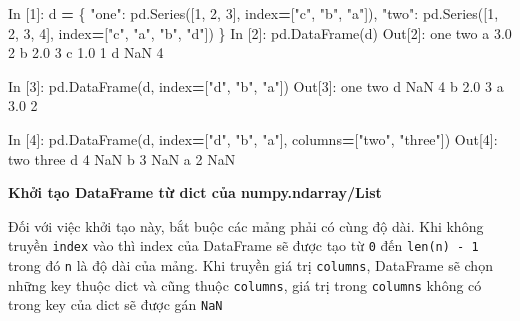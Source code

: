\documentclass[
]{book}
\newenvironment{Shaded}{\begin{snugshade}}{\end{snugshade}}
\newcommand{\DecValTok}[1]{\textcolor[rgb]{0.00,0.00,0.81}{#1}}
\newcommand{\FloatTok}[1]{\textcolor[rgb]{0.00,0.00,0.81}{#1}}
\newcommand{\NormalTok}[1]{#1}
\newcommand{\OperatorTok}[1]{\textcolor[rgb]{0.81,0.36,0.00}{\textbf{#1}}}
\newcommand{\StringTok}[1]{\textcolor[rgb]{0.31,0.60,0.02}{#1}}
\begin{document}
\begin{Shaded}
\begin{Highlighting}[]
\NormalTok{In [}\DecValTok{1}\NormalTok{]: d }\OperatorTok{=}\NormalTok{ \{}
            \StringTok{"one"}\NormalTok{: pd.Series([}\DecValTok{1}\NormalTok{, }\DecValTok{2}\NormalTok{, }\DecValTok{3}\NormalTok{], index}\OperatorTok{=}\NormalTok{[}\StringTok{"c"}\NormalTok{, }\StringTok{"b"}\NormalTok{, }\StringTok{"a"}\NormalTok{]),}
            \StringTok{"two"}\NormalTok{: pd.Series([}\DecValTok{1}\NormalTok{, }\DecValTok{2}\NormalTok{, }\DecValTok{3}\NormalTok{, }\DecValTok{4}\NormalTok{], index}\OperatorTok{=}\NormalTok{[}\StringTok{"c"}\NormalTok{, }\StringTok{"a"}\NormalTok{, }\StringTok{"b"}\NormalTok{, }\StringTok{"d"}\NormalTok{])}
\NormalTok{        \}}
\NormalTok{In [}\DecValTok{2}\NormalTok{]: pd.DataFrame(d)}
\NormalTok{Out[}\DecValTok{2}\NormalTok{]:}
\NormalTok{   one  two}
\NormalTok{a  }\FloatTok{3.0}    \DecValTok{2}
\NormalTok{b  }\FloatTok{2.0}    \DecValTok{3}
\NormalTok{c  }\FloatTok{1.0}    \DecValTok{1}
\NormalTok{d  NaN    }\DecValTok{4}

\NormalTok{In [}\DecValTok{3}\NormalTok{]: pd.DataFrame(d, index}\OperatorTok{=}\NormalTok{[}\StringTok{"d"}\NormalTok{, }\StringTok{"b"}\NormalTok{, }\StringTok{"a"}\NormalTok{])}
\NormalTok{Out[}\DecValTok{3}\NormalTok{]: }
\NormalTok{   one  two}
\NormalTok{d  NaN    }\DecValTok{4}
\NormalTok{b  }\FloatTok{2.0}    \DecValTok{3}
\NormalTok{a  }\FloatTok{3.0}    \DecValTok{2}

\NormalTok{In [}\DecValTok{4}\NormalTok{]: pd.DataFrame(d, index}\OperatorTok{=}\NormalTok{[}\StringTok{"d"}\NormalTok{, }\StringTok{"b"}\NormalTok{, }\StringTok{"a"}\NormalTok{], columns}\OperatorTok{=}\NormalTok{[}\StringTok{"two"}\NormalTok{, }\StringTok{"three"}\NormalTok{])}
\NormalTok{Out[}\DecValTok{4}\NormalTok{]:}
\NormalTok{   two  three}
\NormalTok{d    }\DecValTok{4}\NormalTok{    NaN}
\NormalTok{b    }\DecValTok{3}\NormalTok{    NaN}
\NormalTok{a    }\DecValTok{2}\NormalTok{    NaN}
\end{Highlighting}
\end{Shaded}

\textbf{Khởi tạo DataFrame từ dict của numpy.ndarray/List}

Đối với việc khởi tạo này, bắt buộc các mảng phải có cùng độ dài. Khi không truyền \texttt{index} vào thì
index của DataFrame sẽ được tạo từ \texttt{0} đến \texttt{len(n)\ -\ 1} trong đó \texttt{n} là độ dài của mảng. Khi truyền
giá trị \texttt{columns}, DataFrame sẽ chọn những key thuộc dict và cũng thuộc \texttt{columns}, giá trị trong
\texttt{columns} không có trong key của dict sẽ được gán \texttt{NaN}
\end{document}
